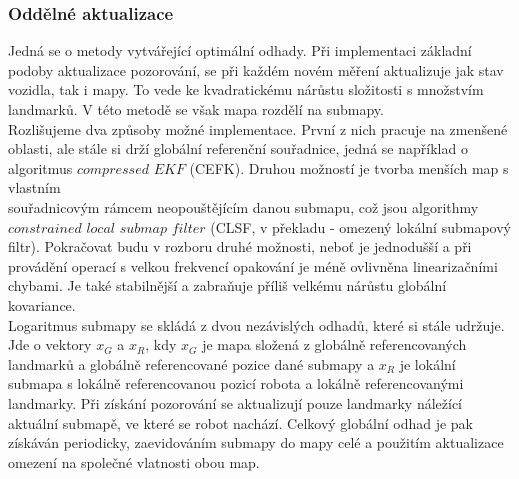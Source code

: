 \documentclass[11pt]{article}
\begin{document}
\subsubsection{Oddělné aktualizace}
Jedná se o metody vytvářející optimální odhady. Při implementaci základní podoby aktualizace pozorování, se při každém novém měření aktualizuje jak stav vozidla, tak i mapy. To vede ke kvadratickému nárůstu složitosti s množstvím landmarků. V této metodě se však mapa rozdělí na submapy.\\
\indent Rozlišujeme dva způsoby možné implementace. První z nich pracuje na zmenšené oblasti, ale stále si drží globální referenční souřadnice, jedná se například o algoritmus $compressed$ $EKF$ (CEFK). Druhou možností je tvorba menších map s vlastním\\ souřadnicovým rámcem neopouštějícím danou submapu, což jsou algorithmy $constrained$ $local$ $submap$ $filter$ (CLSF, v překladu - omezený lokální submapový filtr). Pokračovat budu v rozboru druhé možnosti, neboť je jednodušší a při provádění operací s velkou frekvencí opakování je méně ovlivněna linearizačními chybami. Je také stabilnější a zabraňuje příliš velkému nárůstu globální kovariance. \\
\indent Logaritmus submapy se skládá z dvou nezávislých odhadů, které si stále udržuje. Jde o vektory $x_G$ a $x_R$, kdy $x_G$ je mapa složená z globálně referencovaných landmarků a globálně referencované pozice dané submapy a $x_R$ je lokální submapa s lokálně referencovanou pozicí robota a lokálně referencovanými landmarky. Při získání pozorování se aktualizují pouze landmarky náležící aktuální submapě, ve které se robot nachází. Celkový globální odhad je pak získáván periodicky, zaevidováním submapy do mapy celé a použitím aktualizace omezení na společné vlatnosti obou map.
\end{document}

